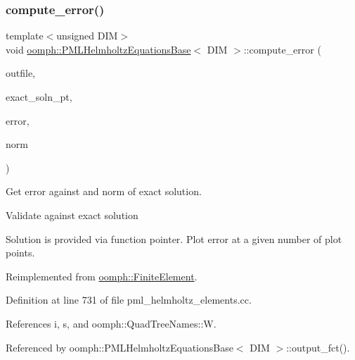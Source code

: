 \subsubsection{\texorpdfstring{compute\+\_\+error()}{compute\_error()}\hspace{0.1cm}{\footnotesize\ttfamily [1/2]}}
{\footnotesize\ttfamily template$<$unsigned D\+IM$>$ \\
void \hyperlink{classoomph_1_1PMLHelmholtzEquationsBase}{oomph\+::\+P\+M\+L\+Helmholtz\+Equations\+Base}$<$ D\+IM $>$\+::compute\+\_\+error (\begin{DoxyParamCaption}\item[{std\+::ostream \&}]{outfile,  }\item[{\hyperlink{classoomph_1_1FiniteElement_a690fd33af26cc3e84f39bba6d5a85202}{Finite\+Element\+::\+Steady\+Exact\+Solution\+Fct\+Pt}}]{exact\+\_\+soln\+\_\+pt,  }\item[{double \&}]{error,  }\item[{double \&}]{norm }\end{DoxyParamCaption})\hspace{0.3cm}{\ttfamily [virtual]}}



Get error against and norm of exact solution. 

Validate against exact solution

Solution is provided via function pointer. Plot error at a given number of plot points. 

Reimplemented from \hyperlink{classoomph_1_1FiniteElement_a73c79a1f1e5b1d334757812a6bbd58ff}{oomph\+::\+Finite\+Element}.



Definition at line 731 of file pml\+\_\+helmholtz\+\_\+elements.\+cc.



References i, s, and oomph\+::\+Quad\+Tree\+Names\+::W.



Referenced by oomph\+::\+P\+M\+L\+Helmholtz\+Equations\+Base$<$ D\+I\+M $>$\+::output\+\_\+fct().

\mbox{\label{classoomph_1_1PMLHelmholtzEquationsBase_a6cd8d2dfd17ff66f86faa87cc25ad113}} 

